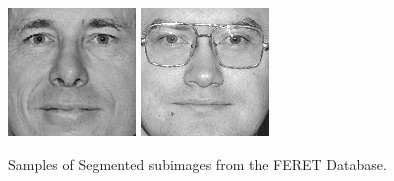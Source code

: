\begin{figure}[ht]
\begin{center}
  \includegraphics[width=\columnwidth/10]{ch5/figures/feret35.jpg}
  \includegraphics[width=\columnwidth/10]{ch5/figures/feret36.jpg}
  \caption{Samples of Segmented subimages from the FERET Database.}
  \label{fig:feretsubimages}
 \end{center}
\end{figure} 


